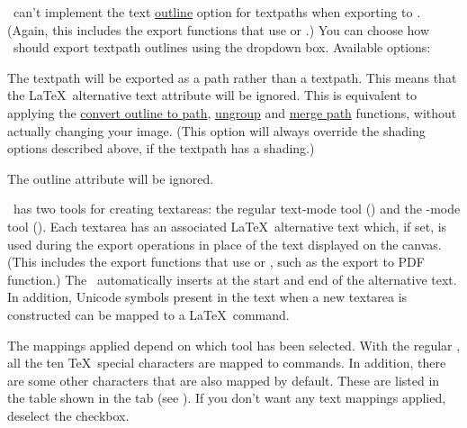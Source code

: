 
\FlowframTk\ can't implement the text
\hyperref[sec:textoutline]{outline} option for
\glspl{textpath} when exporting to . (Again, this
includes the export functions that use  or .)
You can choose how \FlowframTk\ should export \gls{textpath}
outlines using the 
dropdown box. Available options:

\begin{deflist}
\itemtitle
 {}

\begin{itemdesc}
The \gls{textpath} will be exported as a path rather than a
\gls{textpath}. This means that the \LaTeX\
alternative text attribute will be ignored. This is equivalent to
applying the
\hyperref[sec:outlinetopath]{convert outline to path}, 
\hyperref[sec:grouping]{ungroup} and 
\hyperref[sec:mergepaths]{merge path}
functions, without actually changing your image.
(This option will always override the shading options described
above, if the \gls{textpath} has a shading.)
\end{itemdesc}

\itemtitle
 {}

\begin{itemdesc}
The outline attribute will be ignored.
\end{itemdesc}

\end{deflist}

%
%
\FlowframTk\ has two tools for creating \glspl{textarea}: the
regular text-mode tool () and the
-mode tool (). Each \gls{textarea} has an
associated \LaTeX\ alternative text which, if set, is used
during the  export operations in place of the
text displayed on the \gls{canvas}. (This includes the export
functions that use  or , such as
the export to PDF function.) The \mathstool\ automatically
inserts  at the start and end of the
alternative text. In addition, Unicode symbols present in
the text when a new \gls*{textarea} is constructed can be mapped to
a \LaTeX\ command.

The mappings applied depend on which tool has been selected. With
the regular \texttool, all the ten \TeX\ special characters are
mapped to commands. In addition, there are some other characters
that are also mapped by default. These are listed in the table shown
in the \widget{textconfig.textmode} tab (see
). If you don't want any
text mappings applied, deselect the
 \gls{checkbox}.

